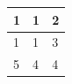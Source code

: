 \documentclass[11pt,a4paper]{article}
\begin{document}
\begin{table}[h]
\begin{tabular}{|l|l|l|}
\hline
1 & 1 & 2 \\ \hline
1 & 1 & 3 \\ \hline
5 & 4 & 4 \\ \hline
\end{tabular}
\end{table}
\end{document}
